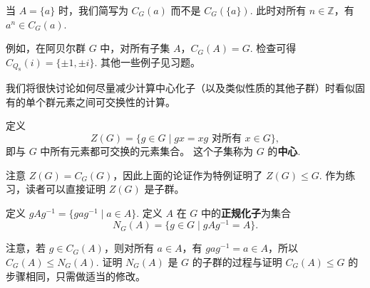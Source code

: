 当 \( A = \{a\} \) 时，我们简写为 \( C_G(a) \) 而不是 \( C_G(\{a\}) \). 
此时对所有 \( n \in \mathbb{Z} \)，有 \( a^n \in C_G(a) \).

例如，在阿贝尔群 \( G \) 中，对所有子集 \( A \)，\( C_G(A) = G \). 
检查可得 \( C_{Q_8}(i) = \{\pm 1, \pm i\} \). 
其他一些例子见习题。

我们将很快讨论如何尽量减少计算中心化子（以及类似性质的其他子群）时看似固有的单个群元素之间可交换性的计算。

\begin{definition}
定义
\[
Z(G) = \{ g \in G \mid gx = xg \text{ 对所有 } x \in G \},
\]
即与 \( G \) 中所有元素都可交换的元素集合。
这个子集称为 \( G \) 的\textbf{中心}.
\end{definition}

注意 \( Z(G) = C_G(G) \)，因此上面的论证作为特例证明了 \( Z(G) \leq G \). 
作为练习，读者可以直接证明 \( Z(G) \) 是子群。

\begin{definition}
定义 \( gAg^{-1} = \{ gag^{-1} \mid a \in A \} \). 定义 \( A \) 在 \( G \) 中的\textbf{正规化子}为集合
\[
N_G(A) = \{ g \in G \mid gAg^{-1} = A \}.
\]
\end{definition}

注意，若 \( g \in C_G(A) \)，则对所有 \( a \in A \)，有 \( gag^{-1} = a \in A \)，所以 \( C_G(A) \leq N_G(A) \). 
证明 \( N_G(A) \) 是 \( G \) 的子群的过程与证明 \( C_G(A) \leq G \) 的步骤相同，只需做适当的修改。


